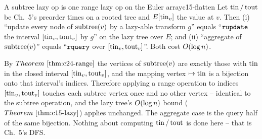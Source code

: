 \begin{proposition}{A subtree lazy op is one range lazy op on the Euler array}{c15-flatten}
Let \(\operatorname{tin}/\operatorname{tout}\) be Ch.~5's preorder times on a rooted tree and \(E[\operatorname{tin}_v]\) the value at \(v\).  Then (i) ``update every node of \(\operatorname{subtree}(v)\) by a lazy-able transform \(g\)'' equals ``\(\texttt{rupdate}\) the interval \([\operatorname{tin}_v,\operatorname{tout}_v]\) by \(g\)'' on the lazy tree over \(E\); and (ii) ``aggregate of \(\operatorname{subtree}(v)\)'' equals ``\(\texttt{rquery}\) over \([\operatorname{tin}_v,\operatorname{tout}_v]\)''.  Both cost \(O(\log n)\).
\end{proposition}
\begin{proofbox}
By \(\thmref{c24-range}\) the vertices of \(\operatorname{subtree}(v)\) are exactly those with \(\operatorname{tin}\) in the closed interval \([\operatorname{tin}_v,\operatorname{tout}_v]\), and the mapping vertex \(\mapsto\operatorname{tin}\) is a bijection onto that interval's indices.  Therefore applying a range operation to indices \([\operatorname{tin}_v,\operatorname{tout}_v]\) touches each subtree vertex once and no other vertex -- identical to the subtree operation, and the lazy tree's \(O(\log n)\) bound (\(\thmref{c15-lazy}\)) applies unchanged.  The aggregate case is the query half of the same bijection.  Nothing about computing \(\operatorname{tin}/\operatorname{tout}\) is done here -- that is Ch.~5's DFS.
\end{proofbox}


